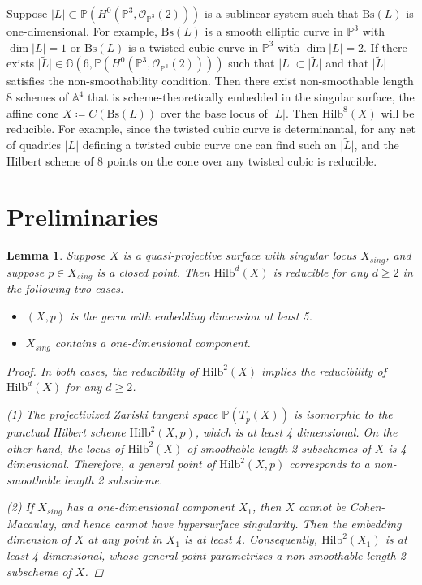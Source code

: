 \documentclass{amsart}[12pt]
\newtheorem{lemma}[theorem]{Lemma}
\theoremstyle{definition}
\theoremstyle{remark}
\numberwithin{equation}{section}
\newcommand{\abs}[1]{\lvert#1\rvert}
\begin{document}
Suppose $\abs{L} \subset \mathbb{P}(H^0(\mathbb{P}^3, \mathcal{O}_{\mathbb{P}^3}(2)))$ is a sublinear system such that $\mathrm{Bs}(L)$ is one-dimensional. For example, $\mathrm{Bs}(L)$ is a smooth elliptic curve in $\mathbb{P}^3$ with $\dim \abs{L} = 1$ or $\mathrm{Bs}(L)$ is a twisted cubic curve in $\mathbb{P}^3$ with $\dim \abs{L} = 2$. If there exists $\abs{\tilde{L}} \in \mathbb{G}(6, \mathbb{P}(H^0(\mathbb{P}^3, \mathcal{O}_{\mathbb{P}^3}(2))))$ such that $\abs{L} \subset \abs{\tilde{L}}$ and that $\abs{\tilde{L}}$ satisfies the non-smoothability condition. Then there exist non-smoothable length $8$ schemes of $\mathbb{A}^4$ that is scheme-theoretically embedded in the singular surface, the affine cone $X \coloneqq C(\mathrm{Bs}(L))$ over the base locus of $\abs{L}$. Then $\mathrm{Hilb}^8(X)$ will be reducible. For example, since the twisted cubic curve is determinantal, for any net of quadrics $\abs{L}$ defining a twisted cubic curve one can find such an $\abs{\tilde{L}}$, and the Hilbert scheme of 8 points on the cone over any twisted cubic is reducible. 


\section{Preliminaries}
\begin{lemma}\label{easy} Suppose $X$ is a quasi-projective surface with singular locus $X_{sing}$, and suppose $p \in X_{sing}$ is a closed point. Then $\mathrm{Hilb}^d(X)$ is reducible for any $d \geq 2$ in the following two cases.
\begin{itemize}
\item[(1)] $(X, p)$ is the germ with embedding dimension at least 5. 
\item[(2)] $X_{sing}$ contains a one-dimensional component. 
\end{itemize}
\begin{proof}
In both cases, the reducibility of $\mathrm{Hilb}^2(X)$ implies the reducibility of $\mathrm{Hilb}^d(X)$ for any $d \geq 2$.

(1) The projectivized Zariski tangent space $\mathbb{P}(T_p(X))$ is isomorphic to the punctual Hilbert scheme $\mathrm{Hilb}^2(X, p)$, which is at least 4 dimensional. On the other hand, the locus of $\mathrm{Hilb}^2(X)$ of smoothable length 2 subschemes of $X$ is 4 dimensional. Therefore, a general point of $\mathrm{Hilb}^2(X, p)$ corresponds to a non-smoothable length 2 subscheme.

(2) If $X_{sing}$ has a one-dimensional component $X_1$, then $X$ cannot be Cohen-Macaulay, and hence cannot have hypersurface singularity. Then the embedding dimension of $X$ at any point in $X_1$ is at least 4. Consequently, $\mathrm{Hilb}^2(X_1)$ is at least 4 dimensional, whose general point parametrizes a non-smoothable length 2 subscheme of $X$.
\end{proof} 
\end{lemma}
\end{document}

